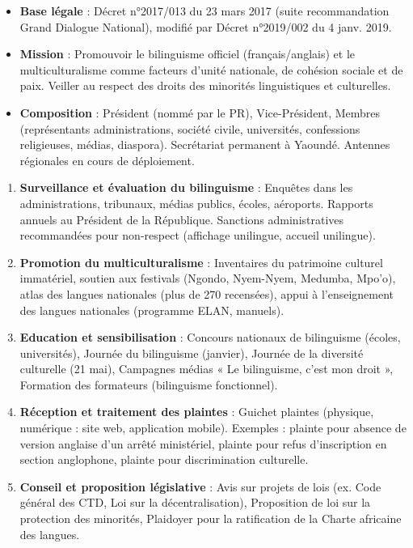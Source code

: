 \documentclass[11pt]{article}
\begin{document}
\begin{definition}
\begin{itemize}
    \item \textbf{Base légale} : Décret n°2017/013 du 23 mars 2017 (suite recommandation Grand Dialogue National), modifié par Décret n°2019/002 du 4 janv. 2019.
    \item \textbf{Mission} : Promouvoir le bilinguisme officiel (français/anglais) et le multiculturalisme comme facteurs d'unité nationale, de cohésion sociale et de paix. Veiller au respect des droits des minorités linguistiques et culturelles.
    \item \textbf{Composition} : Président (nommé par le PR), Vice-Président, Membres (représentants administrations, société civile, universités, confessions religieuses, médias, diaspora). Secrétariat permanent à Yaoundé. Antennes régionales en cours de déploiement.
\end{itemize}
\end{definition}

\begin{propriete}
\begin{enumerate}
    \item \textbf{Surveillance et évaluation du bilinguisme} : Enquêtes dans les administrations, tribunaux, médias publics, écoles, aéroports. Rapports annuels au Président de la République. Sanctions administratives recommandées pour non-respect (affichage unilingue, accueil unilingue).
    \item \textbf{Promotion du multiculturalisme} : Inventaires du patrimoine culturel immatériel, soutien aux festivals (Ngondo, Nyem-Nyem, Medumba, Mpo'o), atlas des langues nationales (plus de 270 recensées), appui à l'enseignement des langues nationales (programme ELAN, manuels).
    \item \textbf{Education et sensibilisation} : Concours nationaux de bilinguisme (écoles, universités), Journée du bilinguisme (janvier), Journée de la diversité culturelle (21 mai), Campagnes médias « Le bilinguisme, c'est mon droit », Formation des formateurs (bilinguisme fonctionnel).
    \item \textbf{Réception et traitement des plaintes} : Guichet plaintes (physique, numérique : site web, application mobile). Exemples : plainte pour absence de version anglaise d'un arrêté ministériel, plainte pour refus d'inscription en section anglophone, plainte pour discrimination culturelle.
    \item \textbf{Conseil et proposition législative} : Avis sur projets de lois (ex. Code général des CTD, Loi sur la décentralisation), Proposition de loi sur la protection des minorités, Plaidoyer pour la ratification de la Charte africaine des langues.
\end{enumerate}
\end{propriete}
\end{document}

